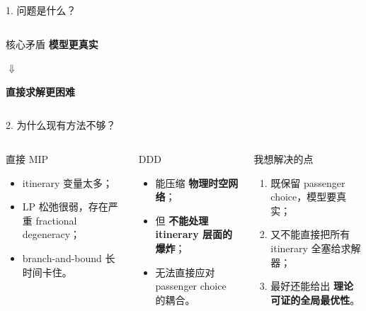\documentclass[aspectratio=169,11pt]{ctexbeamer}
\newcommand{\hl}[1]{\textcolor{TongjiBlue}{\textbf{#1}}}
\begin{document}
\begin{frame}{1. 问题是什么？}
\begin{columns}[T,totalwidth=\textwidth]
\vspace{0.25cm}
\begin{block}{核心矛盾}
\centering
\Large
\textbf{模型更真实}\par
\vspace{0.15cm}
$\Downarrow$\par
\vspace{0.15cm}
\Large
\textcolor{BadRed}{\textbf{直接求解更困难}}
\end{block}
\end{columns}
\end{frame}

\begin{frame}{2. 为什么现有方法不够？}
\begin{columns}[T,totalwidth=\textwidth]
\begin{block}{直接 MIP}
\begin{itemize}
    \item itinerary 变量太多；
    \item LP 松弛很弱，存在严重 fractional degeneracy；
    \item branch-and-bound 长时间卡住。
\end{itemize}
\end{block}

\vspace{0.18cm}
\begin{block}{DDD}
\begin{itemize}
    \item 能压缩 \hl{物理时空网络}；
    \item 但 \hl{不能处理 itinerary 层面的爆炸}；
    \item 无法直接应对 passenger choice 的耦合。
\end{itemize}
\end{block}

\begin{block}{我想解决的点}
\begin{enumerate}
    \item 既保留 passenger choice，模型要真实；
    \item 又不能直接把所有 itinerary 全塞给求解器；
    \item 最好还能给出 \hl{理论可证的全局最优性}。
\end{enumerate}
\end{block}


\end{columns}
\end{frame}
\end{document}

